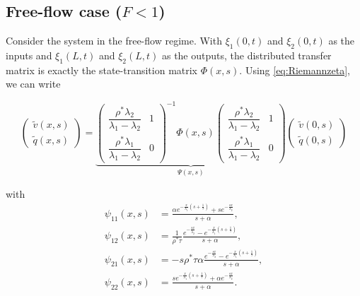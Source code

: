 \documentclass[5p,twocolumn]{elsarticle}
\begin{document}
\subsection{Free-flow case ($F<1$)}
Consider the system in the free-flow regime. With $\xi_1 (0,t)$ and $\xi_2 (0,t)$ as the inputs and $\xi_1(L,t)$ and $\xi_2(L,t)$ as the outputs, the distributed transfer matrix is exactly the state-transition matrix $\Phi(x,s)$. Using \eqref{eq:Riemannzeta}, we can write

{\footnotesize
\begin{equation} \label{vqfreeflow}
\begin{pmatrix}
\widetilde{v}(x,s) \\ \widetilde{q}(x,s)
\end{pmatrix} = \underbrace{ \begin{pmatrix}
\dfrac{\rho^*\lambda_2}{\lambda_1-\lambda_2} & 1\\
\dfrac{\rho^*\lambda_1}{\lambda_1-\lambda_2} & 0
\end{pmatrix}^{-1} \Phi(x,s) 
\begin{pmatrix}
\dfrac{\rho^*\lambda_2}{\lambda_1-\lambda_2} & 1\\
\dfrac{\rho^*\lambda_1}{\lambda_1-\lambda_2} & 0
\end{pmatrix} }_\text{$\Psi (x,s)$} \begin{pmatrix}
\widetilde{v}(0,s) \\ \widetilde{q}(0,s)
\end{pmatrix}
\end{equation}
}

with
\begin{subequations}
\label{psis}
\begin{align}
\psi_{11}(x,s) &= 
\frac{
	\alpha e^{-\frac{x}{\lambda_{1}}\left(s+\frac{1}{\tau}\right)}
		+ s e^{-\frac{sx}{\lambda_{2}}}
}{
	s + \alpha
}, \\
\psi_{12}(x,s) &=
\frac{1}{\rho^* \tau}
\frac{
	e^{-\frac{sx}{\lambda_{2}}}
	-
	e^{-\frac{x}{\lambda_{1}}\left(s+\frac{1}		{\tau}\right)}
}{
	s + \alpha
}, \\
\psi_{21}(x,s) &=
- s \rho^{*} \tau \alpha
\frac{
	e^{-\frac{sx}{\lambda_{2}}}
	-
	e^{-\frac{x}{\lambda_{1}}\left(s+\frac{1}		{\tau}\right)}
}{
	s + \alpha
}, \\
\psi_{22}(x,s) &=
\frac{
	s e^{-\frac{x}{\lambda_{1}}\left(s+\frac{1}{\tau}\right)}
		+ \alpha e^{-\frac{sx}{\lambda_{2}}}
}{
	s + \alpha
}.
\end{align}
\end{subequations}
\end{document}
